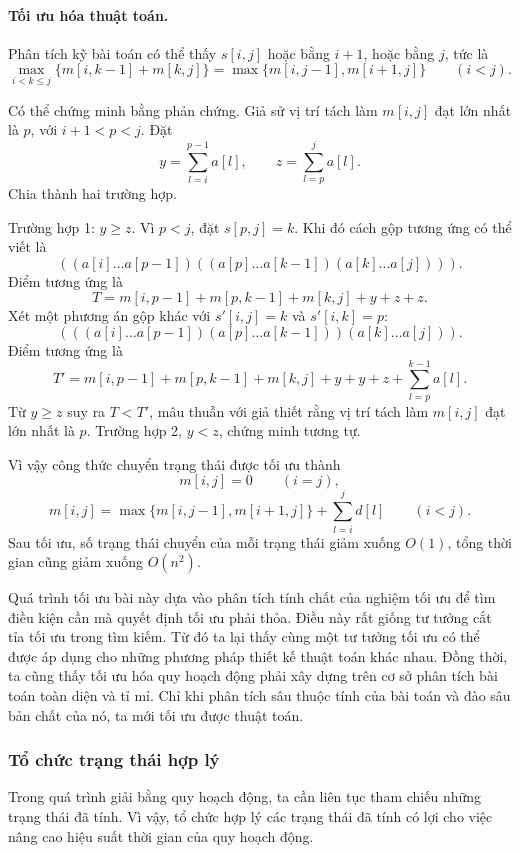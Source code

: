 \documentclass[11pt]{article}
\begin{document}
\paragraph{Tối ưu hóa thuật toán.}
Phân tích kỹ bài toán có thể thấy \(s[i,j]\) hoặc bằng \(i+1\), hoặc bằng
\(j\), tức là
\[
  \max_{i<k\le j}\{m[i,k-1]+m[k,j]\}
  =\max\{m[i,j-1],m[i+1,j]\}\qquad (i<j).
\]

Có thể chứng minh bằng phản chứng. Giả sử vị trí tách làm \(m[i,j]\) đạt lớn
nhất là \(p\), với \(i+1<p<j\). Đặt
\[
  y=\sum_{l=i}^{p-1}a[l],\qquad
  z=\sum_{l=p}^{j}a[l].
\]
Chia thành hai trường hợp.

Trường hợp 1: \(y\ge z\). Vì \(p<j\), đặt \(s[p,j]=k\). Khi đó cách gộp tương
ứng có thể viết là
\[
  ((a[i]\ldots a[p-1])((a[p]\ldots a[k-1])(a[k]\ldots a[j]))).
\]
Điểm tương ứng là
\[
  T=m[i,p-1]+m[p,k-1]+m[k,j]+y+z+z. \tag{2}
\]
Xét một phương án gộp khác với \(s'[i,j]=k\) và \(s'[i,k]=p\):
\[
  (((a[i]\ldots a[p-1])(a[p]\ldots a[k-1]))(a[k]\ldots a[j])).
\]
Điểm tương ứng là
\[
  T'=m[i,p-1]+m[p,k-1]+m[k,j]+y+y+z+\sum_{l=p}^{k-1}a[l]. \tag{3}
\]
Từ \(y\ge z\) suy ra \(T<T'\), mâu thuẫn với giả thiết rằng vị trí tách làm
\(m[i,j]\) đạt lớn nhất là \(p\). Trường hợp 2, \(y<z\), chứng minh tương tự.

Vì vậy công thức chuyển trạng thái được tối ưu thành
\[
  m[i,j]=0\qquad (i=j),
\]
\[
  m[i,j]=\max\{m[i,j-1],m[i+1,j]\}+\sum_{l=i}^{j}d[l]\qquad (i<j).
\]
Sau tối ưu, số trạng thái chuyển của mỗi trạng thái giảm xuống \(O(1)\), tổng
thời gian cũng giảm xuống \(O(n^2)\).

Quá trình tối ưu bài này dựa vào phân tích tính chất của nghiệm tối ưu để tìm
điều kiện cần mà quyết định tối ưu phải thỏa. Điều này rất giống tư tưởng cắt
tỉa tối ưu trong tìm kiếm. Từ đó ta lại thấy cùng một tư tưởng tối ưu có thể
được áp dụng cho những phương pháp thiết kế thuật toán khác nhau. Đồng thời,
ta cũng thấy tối ưu hóa quy hoạch động phải xây dựng trên cơ sở phân tích bài
toán toàn diện và tỉ mỉ. Chỉ khi phân tích sâu thuộc tính của bài toán và đào
sâu bản chất của nó, ta mới tối ưu được thuật toán.

\subsubsection{Tổ chức trạng thái hợp lý}

Trong quá trình giải bằng quy hoạch động, ta cần liên tục tham chiếu những
trạng thái đã tính. Vì vậy, tổ chức hợp lý các trạng thái đã tính có lợi cho
việc nâng cao hiệu suất thời gian của quy hoạch động.
\end{document}
